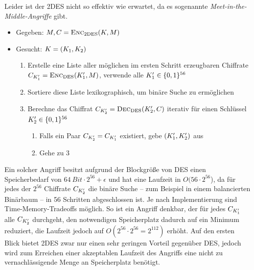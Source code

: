 Leider ist der 2DES nicht so effektiv wie erwartet, da es sogenannte
\emph{Meet-in-the-Middle-Angriffe} \indexMeetInTheMiddle gibt. 
\begin{itemize}
\item Gegeben: $M, C = \textsc{Enc}_{\textnormal{2DES}}(K, M)$
\item Gesucht: $K = (K_{1},K_{2})$
  \begin{enumerate}
  \item Erstelle eine Liste aller möglichen im ersten Schritt
    erzeugbaren Chiffrate $C_{K'_{1}} =
    \textsc{Enc}_{\textnormal{DES}}(K'_{1}, M)$, \dh verwende alle
    $K'_{1} \in \{0,1\}^{56}$ 
  \item Sortiere diese Liste lexikographisch, um binäre Suche zu ermöglichen
  \item Berechne das Chiffrat $C_{K'_{2}} =
    \textsc{Dec}_{\textnormal{DES}}(K'_{2}, C)$ iterativ für einen
    Schlüssel $K'_{2} \in \{0,1\}^{56}$ 
    \begin{enumerate}
    \item Falls ein Paar $C_{K'_2} = C_{K'_{1}}$
      existiert, gebe $(K'_{1},K'_{2})$ aus 
    \item Gehe zu 3
    \end{enumerate}
  \end{enumerate}
\end{itemize}

Ein solcher Angriff besitzt aufgrund der Blockgröße von DES einen
Speicherbedarf von $64\ Bit \cdot 2^{56} + \epsilon$ und hat eine
Laufzeit in $O(56 \cdot 2^{56}$), da für jedes der $2^{56}$ Chiffrate
$C_{K'_2}$ die binäre Suche -- zum Beispiel in einem
balancierten Binärbaum -- in 56 Schritten abgeschlossen ist. Je nach
Implementierung sind Time-Memory-Tradeoffs möglich. So ist ein Angriff
denkbar, der für jedes $C_{K'_1}$ alle $C_{K'_2}$
durchgeht, den notwendigen Speicherplatz dadurch auf ein Minimum
reduziert, die Laufzeit jedoch auf $O(2^{56} \cdot 2^{56} = 2^{112})$
erhöht. Auf den ersten Blick bietet 2DES zwar nur einen sehr geringen
Vorteil gegenüber DES, jedoch wird zum Erreichen einer akzeptablen
Laufzeit des Angriffs eine nicht zu vernachlässigende Menge an
Speicherplatz benötigt.

